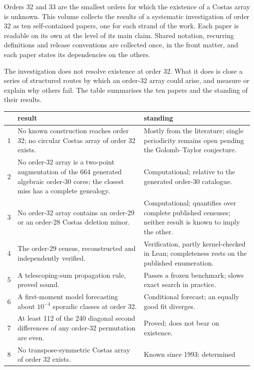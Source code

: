 Orders 32 and 33 are the smallest orders for which the existence of a Costas array is unknown. This
volume collects the results of a systematic investigation of order 32 as ten self-contained
papers, one for each strand of the work. Each paper is readable on its own at the level of its main claim. Shared notation, recurring definitions and release conventions are collected once, in the front matter, and each paper states its dependencies on the others.

The investigation does not resolve existence at order 32. What it does is close a series of
structured routes by which an order-32 array could arise, and measure or explain why others fail.
The table summarises the ten papers and the standing of their results.

\begin{center}
\small
\begin{tabular}{@{}p{}>{\raggedright\arraybackslash}p{}>{\raggedright\arraybackslash}p{}@{}}
\toprule
& result & standing \\
\midrule
1 & No known construction reaches order 32; no circular Costas array of order 32 exists. &
Mostly from the literature; single periodicity remains open pending the Golomb--Taylor conjecture. \\
2 & No order-32 array is a two-point augmentation of the 664 generated algebraic order-30 cores;
the closest miss has a complete genealogy. & Computational; relative to the generated order-30
catalogue. \\
3 & No order-32 array contains an order-29 or an order-28 Costas deletion minor. &
Computational; quantifies over complete published censuses; neither result is known to imply the other. \\
4 & The order-29 census, reconstructed and independently verified. & Verification, partly
kernel-checked in Lean; completeness rests on the published enumeration. \\
5 & A telescoping-sum propagation rule, proved sound. & Passes a frozen benchmark; slows exact search
in practice. \\
6 & A first-moment model forecasting about $10^{-4}$ sporadic classes at order 32. & Conditional
forecast; an equally good fit diverges. \\
7 & At least 112 of the 240 diagonal second differences of any order-32 permutation are even. &
Proved; does not bear on existence. \\
8 & No transpose-symmetric Costas array of order 32 exists. & Known since 1993; determined

\end{tabular}
\end{center}
